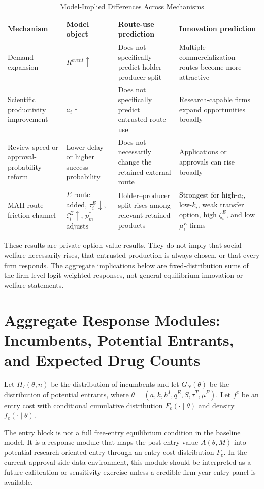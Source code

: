 \documentclass[12pt]{article}
\newcommand{\1}{\mathbf{1}}
\begin{document}
\begin{table}[htbp]
\centering
\scriptsize
\caption{Model-Implied Differences Across Mechanisms}
\label{tab:alternative_mechanisms}
\begin{tabularx}{\textwidth}{@{}L{0.22\textwidth}L{0.20\textwidth}L{0.27\textwidth}Y@{}}
\toprule
Mechanism & Model object & Route-use prediction & Innovation prediction \\
\midrule
Demand expansion & $R^{event}\uparrow$ & Does not specifically predict holder--producer split & Multiple commercialization routes become more attractive \\
Scientific productivity improvement & $a_i\uparrow$ & Does not specifically predict entrusted-route use & Research-capable firms expand opportunities broadly \\
Review-speed or approval-probability reform & Lower delay or higher success probability & Does not necessarily change the retained external route & Applications or approvals can rise broadly \\
MAH route-friction channel & $E$ route added, $\tau_i^E\downarrow$, $\zeta_i^E\uparrow$, $p_m^*$ adjusts & Holder--producer split rises among relevant retained products & Strongest for high-$a_i$, low-$k_i$, weak transfer option, high $\zeta_i^E$, and low $\mu_i^E$ firms \\
\bottomrule
\end{tabularx}
\end{table}

These results are private option-value results. They do not imply that social welfare necessarily rises, that entrusted production is always chosen, or that every firm responds. The aggregate implications below are fixed-distribution sums of the firm-level logit-weighted responses, not general-equilibrium innovation or welfare statements.

\section{Aggregate Response Modules: Incumbents, Potential Entrants, and Expected Drug Counts}

Let $H_I(\theta,n)$ be the distribution of incumbents and let $G_N(\theta)$ be the distribution of potential entrants, where $\theta=(a,k,h^I,q^E,S,\tau^T,\mu^E)$. Let $f^e$ be an entry cost with conditional cumulative distribution $F_e(\cdot\mid\theta)$ and density $f_e(\cdot\mid\theta)$.

The entry block is not a full free-entry equilibrium condition in the baseline model. It is a response module that maps the post-entry value $A(\theta,M)$ into potential research-oriented entry through an entry-cost distribution $F_e$. In the current approval-side data environment, this module should be interpreted as a future calibration or sensitivity exercise unless a credible firm-year entry panel is available.
\end{document}
